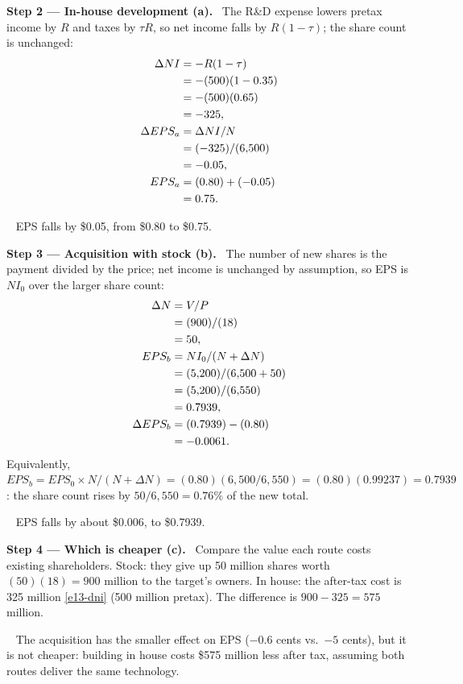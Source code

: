 \documentclass[11pt,a4paper]{article}
\newcommand{\step}[2]{\par\medskip\noindent\textbf{Step #1 --- #2.}~}
\newcommand{\answer}[1]{\par\smallskip\noindent\fbox{\textbf{Answer #1.}}~}
\begin{document}
\step{2}{In-house development (a)}
The R\&D expense lowers pretax income by $R$ and taxes by $\tau R$, so net income falls by
$R(1-\tau)$; the share count is unchanged:
\begin{align}
  \Delta NI &= -R(1-\tau) \notag\\
  &= -(500)(1 - 0.35) \notag\\
  &= -(500)(0.65) \notag\\
  &= -325, \label{e13-dni}\\
  \Delta EPS_a &= \Delta NI/N \notag\\
  &= (-325)/(6{,}500) \notag\\
  &= -0.05, \notag\\
  EPS_a &= (0.80) + (-0.05) \notag\\
  &= 0.75. \notag
\end{align}

\answer{(a)} EPS falls by \$0.05, from \$0.80 to \$0.75.

\step{3}{Acquisition with stock (b)}
The number of new shares is the payment divided by the price; net income is unchanged by
assumption, so EPS is $NI_0$ over the larger share count:
\begin{align}
  \Delta N &= V/P \notag\\
  &= (900)/(18) \notag\\
  &= 50, \label{e13-dn}\\
  EPS_b &= NI_0/(N + \Delta N) \notag\\
  &= (5{,}200)/(6{,}500 + 50) \notag\\
  &= (5{,}200)/(6{,}550) \notag\\
  &= 0.7939, \notag\\
  \Delta EPS_b &= (0.7939) - (0.80) \notag\\
  &= -0.0061. \notag
\end{align}
Equivalently, $EPS_b = EPS_0 \times N/(N + \Delta N) = (0.80)(6{,}500/6{,}550) = (0.80)(0.99237)
= 0.7939$: the share count rises by $50/6{,}550 = 0.76\%$ of the new total.

\answer{(b)} EPS falls by about \$0.006, to \$0.7939.

\step{4}{Which is cheaper (c)}
Compare the value each route costs existing shareholders. Stock: they give up 50 million shares
worth $(50)(18) = 900$ million to the target's owners. In house: the after-tax cost is 325 million
\eqref{e13-dni} (500 million pretax). The difference is $900 - 325 = 575$ million.

\answer{(c)} The acquisition has the smaller effect on EPS ($-0.6$ cents vs.\ $-5$ cents), but it is
not cheaper: building in house costs \$575 million less after tax, assuming both routes deliver the
same technology.
\end{document}
